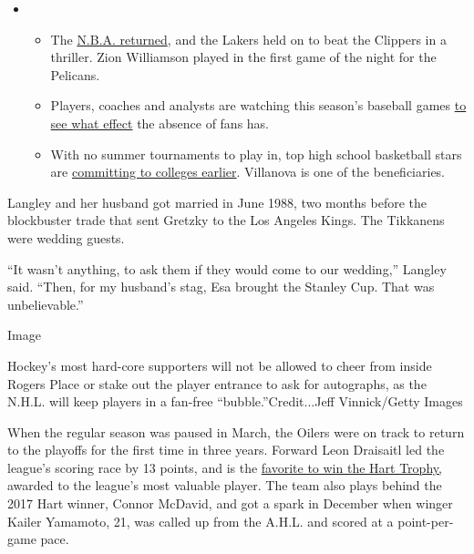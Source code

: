 \begin{itemize}
\item
  \begin{itemize}
  \tightlist
  \item
    The
    \href{https://www.nytimes3xbfgragh.onion/2020/07/30/sports/basketball/clippers-lakers.html?action=click\&pgtype=Article\&state=default\&region=MAIN_CONTENT_2\&context=storylines_keepup}{N.B.A.
    returned}, and the Lakers held on to beat the Clippers in a
    thriller. Zion Williamson played in the first game of the night for
    the Pelicans.
  \item
    Players, coaches and analysts are watching this season's baseball
    games
    \href{https://www.nytimes3xbfgragh.onion/2020/07/31/sports/baseball/baseball-empty-stadiums-effects.html?action=click\&pgtype=Article\&state=default\&region=MAIN_CONTENT_2\&context=storylines_keepup}{to
    see what effect} the absence of fans has.
  \item
    With no summer tournaments to play in, top high school basketball
    stars are
    \href{https://www.nytimes3xbfgragh.onion/2020/07/30/sports/ncaabasketball/college-basketball-recruiting.html?action=click\&pgtype=Article\&state=default\&region=MAIN_CONTENT_2\&context=storylines_keepup}{committing
    to colleges earlier}. Villanova is one of the beneficiaries.
  \end{itemize}
\end{itemize}

Langley and her husband got married in June 1988, two months before the
blockbuster trade that sent Gretzky to the Los Angeles Kings. The
Tikkanens were wedding guests.

``It wasn't anything, to ask them if they would come to our wedding,''
Langley said. ``Then, for my husband's stag, Esa brought the Stanley
Cup. That was unbelievable.''

Image

Hockey's most hard-core supporters will not be allowed to cheer from
inside Rogers Place or stake out the player entrance to ask for
autographs, as the N.H.L. will keep players in a fan-free
``bubble.''Credit...Jeff Vinnick/Getty Images

When the regular season was paused in March, the Oilers were on track to
return to the playoffs for the first time in three years. Forward Leon
Draisaitl led the league's scoring race by 13 points, and is the
\href{https://www.nytimes3xbfgragh.onion/2020/07/27/sports/hockey/nhl-awards-restart-postseason.html}{favorite
to win the Hart Trophy,} awarded to the league's most valuable player.
The team also plays behind the 2017 Hart winner, Connor McDavid, and got
a spark in December when winger Kailer Yamamoto, 21, was called up from
the A.H.L. and scored at a point-per-game pace.


